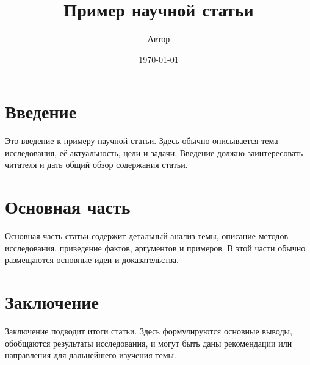 \documentclass{article}
\title{Пример научной статьи}
\author{Автор}
\date{\today}
\begin{document}
\maketitle

\section{Введение}

Это введение к примеру научной статьи. Здесь обычно описывается тема исследования, её актуальность, цели и задачи. Введение должно заинтересовать читателя и дать общий обзор содержания статьи.

\section{Основная часть}

Основная часть статьи содержит детальный анализ темы, описание методов исследования, приведение фактов, аргументов и примеров. В этой части обычно размещаются основные идеи и доказательства.

\section{Заключение}

Заключение подводит итоги статьи. Здесь формулируются основные выводы, обобщаются результаты исследования, и могут быть даны рекомендации или направления для дальнейшего изучения темы.
\end{document}
